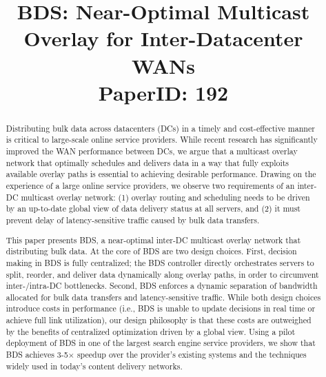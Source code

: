 \documentclass[letterpaper,twocolumn,10pt]{article}
\newcommand{\name}{BDS\xspace}
\begin{document}
{\title{\name: Near-Optimal Multicast Overlay for Inter-Datacenter WANs\\
\vspace{0.5cm}
\normalsize{PaperID: 192} \vspace{-1cm}}

\maketitle


\begin{abstract}

Distributing bulk data across datacenters (DCs) in a timely and
cost-effective manner is critical to large-scale online service
providers.
While recent research has significantly improved the WAN performance
between DCs, we argue that a multicast overlay network that optimally
schedules and delivers data in a way that fully exploits available
overlay paths is essential to achieving desirable performance.
Drawing on the experience of a large online service providers, we
observe two requirements of an inter-DC multicast overlay network:
(1) overlay routing and scheduling needs to be driven by an
up-to-date global view of data delivery status at all servers, and
(2) it must prevent delay of latency-sensitive
traffic caused by bulk data transfers.

This paper presents \name, a near-optimal inter-DC multicast overlay
network that distributing bulk data.
At the core of \name are two design choices.
First, decision making in \name is fully centralized; the \name
controller directly orchestrates servers to split, reorder, and
deliver data dynamically along overlay paths, in order to
circumvent inter-/intra-DC bottlenecks.
Second, \name enforces a dynamic separation of bandwidth allocated
for bulk data transfers and latency-sensitive traffic.
While both design choices introduce costs in performance (i.e.,
\name is unable to update decisions in real time or achieve full
link utilization), our design philosophy is that these costs are
outweighed by the benefits of centralized optimization driven
by a global view.
Using a pilot deployment of \name in one of the largest search
engine service providers, we show that \name achieves 3-5$\times$
speedup over the provider's existing systems and the techniques
widely used in today's content delivery networks.



\end{abstract}}
\end{document}
